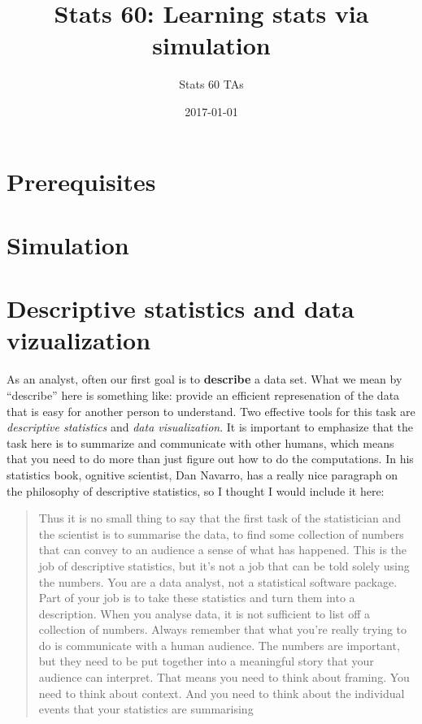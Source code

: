 \documentclass[]{book}
\title{Stats 60: Learning stats via simulation}
\author{Stats 60 TAs}
\date{2017-01-01}
\begin{document}
\maketitle

{
\setcounter{tocdepth}{1}
\tableofcontents
}
\chapter{Prerequisites}\label{prerequisites}

\chapter{Simulation}\label{simulation}

\chapter{Descriptive statistics and data
vizualization}\label{descriptives}

As an analyst, often our first goal is to \textbf{describe} a data set.
What we mean by ``describe'' here is something like: provide an
efficient represenation of the data that is easy for another person to
understand. Two effective tools for this task are \emph{descriptive
statistics} and \emph{data visualization}. It is important to emphasize
that the task here is to summarize and communicate with other humans,
which means that you need to do more than just figure out how to do the
computations. In his statistics book, ognitive scientist, Dan Navarro,
has a really nice paragraph on the philosophy of descriptive statistics,
so I thought I would include it here:

\begin{quote}
Thus it is no small thing to say that the first task of the statistician
and the scientist is to summarise the data, to find some collection of
numbers that can convey to an audience a sense of what has happened.
This is the job of descriptive statistics, but it's not a job that can
be told solely using the numbers. You are a data analyst, not a
statistical software package. Part of your job is to take these
statistics and turn them into a description. When you analyse data, it
is not sufficient to list off a collection of numbers. Always remember
that what you're really trying to do is communicate with a human
audience. The numbers are important, but they need to be put together
into a meaningful story that your audience can interpret. That means you
need to think about framing. You need to think about context. And you
need to think about the individual events that your statistics are
summarising
\end{quote}
\end{document}
